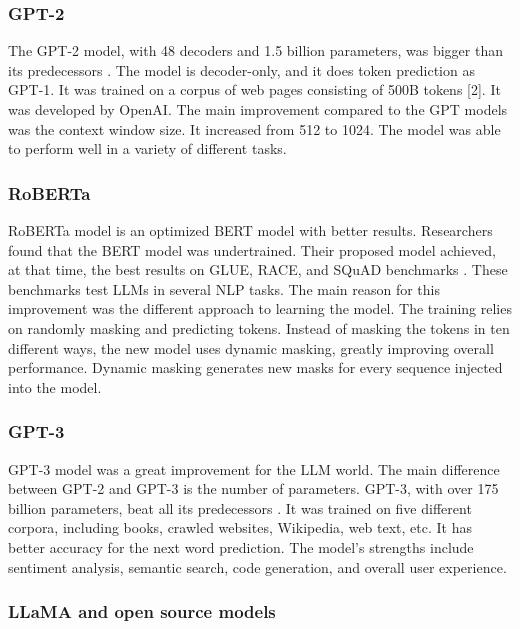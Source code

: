 \subsubsection{GPT-2}

The GPT-2 model, with 48 decoders and 1.5 billion parameters, was bigger than its predecessors \cite{Radford2019LanguageMA}. The model is decoder-only, and it does token prediction as GPT-1. It was trained on a corpus of web pages consisting of 500B tokens [2]. It was developed by OpenAI. The main improvement compared to the GPT models was the context window size. It increased from 512 to 1024. The model was able to perform well in a variety of different tasks. 

\subsubsection{RoBERTa}

RoBERTa model is an optimized BERT model with better results. Researchers found that the BERT model was undertrained. Their proposed model achieved, at that time, the best results on GLUE, RACE, and SQuAD benchmarks \cite{liu2019roberta}. These benchmarks test LLMs in several NLP tasks. The main reason for this improvement was the different approach to learning the model. The training relies on randomly masking and predicting tokens. Instead of masking the tokens in ten different ways, the new model uses dynamic masking, greatly improving overall performance. Dynamic masking generates new masks for every sequence injected into the model. 


\subsubsection{GPT-3}

GPT-3 model was a great improvement for the LLM world. The main difference between GPT-2 and GPT-3 is the number of parameters. GPT-3, with over 175 billion parameters, beat all its predecessors \cite{gpt3}. It was trained on five different corpora, including books, crawled websites, Wikipedia, web text, etc. It has better accuracy for the next word prediction. The model's strengths include sentiment analysis, semantic search, code generation, and overall user experience. 


\subsubsection{LLaMA and open source models}

